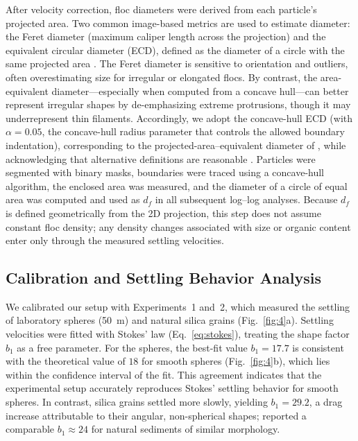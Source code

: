 \documentclass{agujournal2019}
\begin{document}
After velocity correction, floc diameters were derived from each particle's projected area. Two common image-based metrics are used to estimate diameter: the Feret diameter (maximum caliper length across the projection) and the equivalent circular diameter (ECD), defined as the diameter of a circle with the same projected area \cite{jarvis2005measuring, smith2015image}. The Feret diameter is sensitive to orientation and outliers, often overestimating size for irregular or elongated flocs. By contrast, the area-equivalent diameter---especially when computed from a concave hull---can better represent irregular shapes by de-emphasizing extreme protrusions, though it may underrepresent thin filaments. Accordingly, we adopt the concave-hull ECD (with $\alpha = 0.05$, the concave-hull radius parameter that controls the allowed boundary indentation), corresponding to the projected-area--equivalent diameter of , while acknowledging that alternative definitions are reasonable \cite{jarvis2005measuring}. Particles were segmented with binary masks, boundaries were traced using a concave-hull algorithm, the enclosed area was measured, and the diameter of a circle of equal area was computed and used as \(d_f\) in all subsequent log--log analyses. Because $d_f$ is defined geometrically from the 2D projection, this step does not assume constant floc density; any density changes associated with size or organic content enter only through the measured settling velocities.

\subsection{Calibration and Settling Behavior Analysis}

We calibrated our setup with Experiments~1 and~2, which measured the settling of laboratory spheres (50~\textmu m) and natural silica grains (Fig.~\ref{fig:4}a). Settling velocities were fitted with Stokes' law (Eq.~\eqref{eq:stokes}), treating the shape factor $b_1$ as a free parameter. For the spheres, the best-fit value $b_1 = 17.7$ is consistent with the theoretical value of $18$ for smooth spheres (Fig.~\ref{fig:4}b), which lies within the confidence interval of the fit. This agreement indicates that the experimental setup accurately reproduces Stokes' settling behavior for smooth spheres. In contrast, silica grains settled more slowly, yielding $b_1 = 29.2$, a drag increase attributable to their angular, non-spherical shapes;  reported a comparable $b_1 \approx 24$ for natural sediments of similar morphology.
\end{document}
